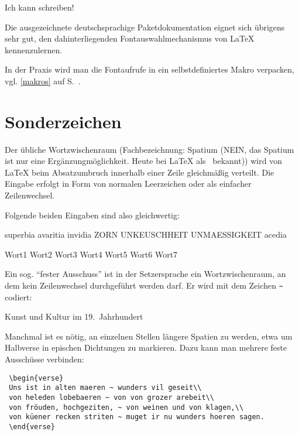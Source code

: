 \begin{lfgwexample}{}
{
\huge
Ich kann schreiben!}
\end{lfgwexample}

Die ausgezeichnete deutschsprachige Paketdokumentation eignet sich übrigens sehr gut,
den dahinterliegenden Fontauswahlmechanismus von \LaTeX{} kennenzulernen.

In der Praxis wird man die Fontaufrufe in ein selbstdefiniertes Makro verpacken, 
vgl. \ref{makros} auf S.~\pageref{makros}.


\section{Sonderzeichen}

\cite{voss:dtk20011/1}


Der übliche Wortzwischenraum (Fachbezeichnung: Spatium (NEIN, das Spatium ist nur eine Ergänzungmöglichkeit. Heute bei LaTeX als \, bekannt)) wird von \LaTeX{} beim Absatzumbruch innerhalb einer Zeile
gleichmäßig verteilt. Die Eingabe erfolgt in Form von normalen Leerzeichen oder als 
einfacher Zeilenwechsel.

Folgende beiden Eingaben sind also gleichwertig:

\begin{LTXexample}
 superbia avaritia invidia ZORN UNKEUSCHHEIT UNMAESSIGKEIT acedia
 
 Wort1
 Wort2
 Wort3
 Wort4
 Wort5
 Wort6
 Wort7
\end{LTXexample}

Ein sog. \enquote{fester Ausschuss} ist in der Setzersprache ein Wortzwischenraum, an dem 
kein Zeilenwechsel durchgeführt werden darf. Er wird mit dem Zeichen \lstinline/~/
codiert:

\begin{LTXexample}
 Kunst und Kultur im 19.~Jahrhundert
\end{LTXexample}

Manchmal ist es nötig, an einzelnen Stellen längere Spatien zu werden, etwa um Halbverse 
in epischen Dichtungen zu markieren. Dazu kann man mehrere feste Ausschüsse verbinden:

\begin{lstlisting}
 \begin{verse}
 Uns ist in alten maeren ~ wunders vil geseit\\
 von heleden lobebaeren ~ von von grozer arebeit\\
 von fröuden, hochgeziten, ~ von weinen und von klagen,\\
 von küener recken striten ~ muget ir nu wunders hoeren sagen.
 \end{verse}
\end{lstlisting}

